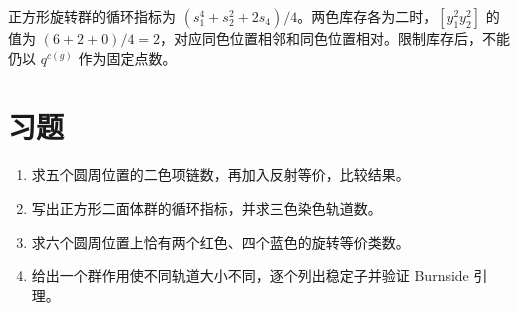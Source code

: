 正方形旋转群的循环指标为 $(s_1^4+s_2^2+2s_4)/4$。两色库存各为二时，$[y_1^2y_2^2]$ 的值为 $(6+2+0)/4=2$，对应同色位置相邻和同色位置相对。限制库存后，不能仍以 $q^{c(g)}$ 作为固定点数。

\section{习题}
\begin{enumerate}
  \item\label{ex:symmetry-1} 求五个圆周位置的二色项链数，再加入反射等价，比较结果。
  \item\label{ex:symmetry-2} 写出正方形二面体群的循环指标，并求三色染色轨道数。
  \item\label{ex:symmetry-3} 求六个圆周位置上恰有两个红色、四个蓝色的旋转等价类数。
  \item\label{ex:symmetry-4} 给出一个群作用使不同轨道大小不同，逐个列出稳定子并验证 Burnside 引理。
\end{enumerate}

